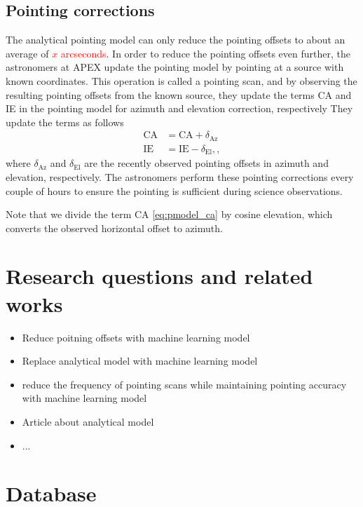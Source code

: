 \subsection{Pointing corrections} 
The analytical pointing model can only reduce the pointing offsets to about an average of \textcolor{red}{$x$ arcseconds}.
In order to reduce the pointing offsets even further, the astronomers at APEX update the pointing model by pointing at a source with known coordinates.
This operation is called a pointing scan, and by observing the resulting pointing offsets from the known source,
they update the terms CA and IE in the pointing model for azimuth and elevation correction, respectively
They update the terms as follows
\begin{align}
    \text{CA} &= \text{CA} + \delta_{\text{Az}} \label{eq:ca}\\ 
    \text{IE} &= \text{IE} - \delta_{\text{El}},\label{eq:ie},
\end{align}
where $\delta_{\text{Az}}$ and $\delta_{\text{El}}$ are the recently observed pointing offsets in azimuth and elevation, respectively.
The astronomers perform these pointing corrections every couple of hours to ensure the pointing is sufficient during science observations.

Note that we divide the term CA \eqref{eq:pmodel_ca} by cosine elevation, which converts the observed horizontal offset to azimuth.


\section{Research questions and related works}
\begin{itemize}
    \item Reduce poitning offsets with machine learning model
    \item Replace analytical model with machine learning model
    \item reduce the frequency of pointing scans while maintaining pointing accuracy with machine learning model
\end{itemize}

\begin{itemize}
    \item Article about analytical model
    \item ...
\end{itemize}

\section{Database}


